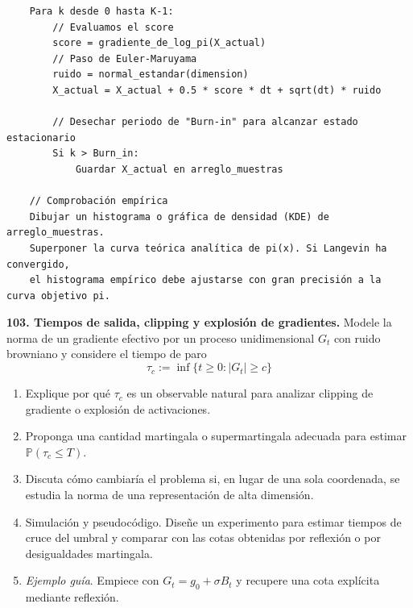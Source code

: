 \documentclass[11pt, letterpaper]{article}
\begin{document}
\begin{solucion}
\begin{verbatim}
    Para k desde 0 hasta K-1:
        // Evaluamos el score
        score = gradiente_de_log_pi(X_actual)
        // Paso de Euler-Maruyama
        ruido = normal_estandar(dimension)
        X_actual = X_actual + 0.5 * score * dt + sqrt(dt) * ruido
        
        // Desechar periodo de "Burn-in" para alcanzar estado estacionario
        Si k > Burn_in:
            Guardar X_actual en arreglo_muestras

    // Comprobación empírica
    Dibujar un histograma o gráfica de densidad (KDE) de arreglo_muestras.
    Superponer la curva teórica analítica de pi(x). Si Langevin ha convergido, 
    el histograma empírico debe ajustarse con gran precisión a la curva objetivo pi.
    \end{verbatim}
\end{solucion}

\newpage

\begin{ejercicio}
    \textbf{103. Tiempos de salida, clipping y explosión de gradientes.} Modele la norma de un gradiente efectivo por un proceso unidimensional $G_{t}$ con ruido browniano y considere el tiempo de paro
    \[ \tau_{c}:=\inf\{t\ge 0:|G_{t}|\ge c\} \]
    \begin{enumerate}
        \item Explique por qué $\tau_{c}$ es un observable natural para analizar clipping de gradiente o explosión de activaciones.
        \item Proponga una cantidad martingala o supermartingala adecuada para estimar $\mathbb{P}(\tau_{c}\le T)$.
        \item Discuta cómo cambiaría el problema si, en lugar de una sola coordenada, se estudia la norma de una representación de alta dimensión.
        \item Simulación y pseudocódigo. Diseñe un experimento para estimar tiempos de cruce del umbral y comparar con las cotas obtenidas por reflexión o por desigualdades martingala.
        \item \textit{Ejemplo guía}. Empiece con $G_{t}=g_{0}+\sigma B_{t}$ y recupere una cota explícita mediante reflexión.
    \end{enumerate}
\end{ejercicio}

\vspace{5mm}
\end{document}
